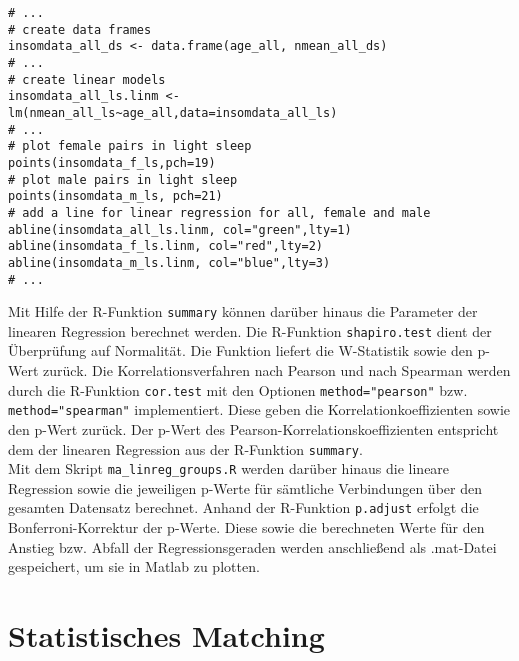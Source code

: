 \begin{lstlisting}[caption={Erstellung eines Streudiagramms und Einzeichnung der Regressionslinien in dem Skript ma\_linreg\_nmean\_age.R}, label={lst:nmean_age}]
# ...
# create data frames
insomdata_all_ds <- data.frame(age_all, nmean_all_ds)
# ...
# create linear models
insomdata_all_ls.linm <- lm(nmean_all_ls~age_all,data=insomdata_all_ls)
# ...
# plot female pairs in light sleep
points(insomdata_f_ls,pch=19)
# plot male pairs in light sleep
points(insomdata_m_ls, pch=21)
# add a line for linear regression for all, female and male 
abline(insomdata_all_ls.linm, col="green",lty=1)
abline(insomdata_f_ls.linm, col="red",lty=2)
abline(insomdata_m_ls.linm, col="blue",lty=3)
# ...
\end{lstlisting}

Mit Hilfe der R-Funktion \texttt{summary} können darüber hinaus die Parameter der linearen Regression berechnet werden. Die R-Funktion \texttt{shapiro.test} dient der Überprüfung auf Normalität. Die Funktion liefert die W-Statistik sowie den p-Wert zurück. Die Korrelationsverfahren nach Pearson und nach Spearman werden durch die R-Funktion \texttt{cor.test} mit den Optionen \texttt{method="pearson"} bzw. \texttt{method="spearman"} implementiert. Diese geben die Korrelationkoeffizienten sowie den p-Wert zurück. Der p-Wert des Pearson-Korrelationskoeffizienten entspricht dem der linearen Regression aus der R-Funktion \texttt{summary}.\\

Mit dem Skript \texttt{ma\_linreg\_groups.R} werden darüber hinaus die lineare Regression sowie die jeweiligen p-Werte für sämtliche Verbindungen über den gesamten Datensatz berechnet. Anhand der R-Funktion \texttt{p.adjust} erfolgt die Bonferroni-Korrektur der p-Werte. Diese sowie die berechneten Werte für den Anstieg bzw. Abfall der Regressionsgeraden werden anschließend als .mat-Datei gespeichert, um sie in Matlab zu plotten.

\section{Statistisches Matching}

